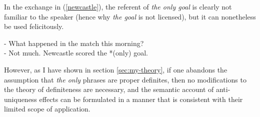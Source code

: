 In the exchange in (\ref{newcastle}), the referent of \textit{the only goal} is clearly not familiar to the speaker (hence why \textit{the goal} is not licensed), but it can nonetheless be used felicitously.

\begin{exe}
	\ex \label{newcastle} - What happened in the match this morning? \\
	- Not much. Newcastle scored the *(only) goal.
\end{exe}

However, as I have shown in section \ref{sec:my-theory}, if one abandons the assumption that \textit{the only} phrases are proper definites, then no modifications to the theory of definiteness are necessary, and the semantic account of anti-uniqueness effects can be formulated in a manner that is consistent with their limited scope of application.